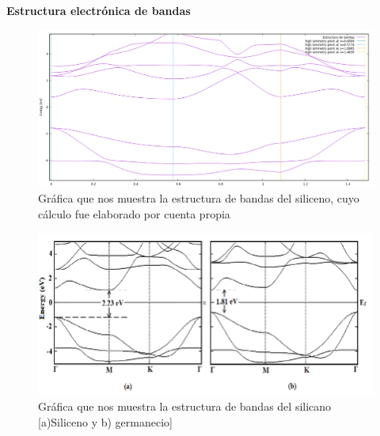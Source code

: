 \begin{frame}
    \textbf{Estructura electrónica de bandas}
    \begin{figure}[H]
        \centering
        \includegraphics[scale=0.3]{images_silicano/bands_structure_silicane_10_bands_relax.png}
        \caption{Gráfica que nos muestra la estructura de bandas del siliceno, cuyo cálculo fue elaborado por cuenta propia}
    \end{figure}
\end{frame}

\begin{frame}
    \begin{figure}[H]
        \centering
        \includegraphics[scale=0.35]{images_silicano/Bandstructure-of-a-silicane-and-b-germanane.png}
        \caption{Gráfica que nos muestra la estructura de bandas del silicano [a)Siliceno y b) germanecio] }
    \end{figure}
\end{frame}




